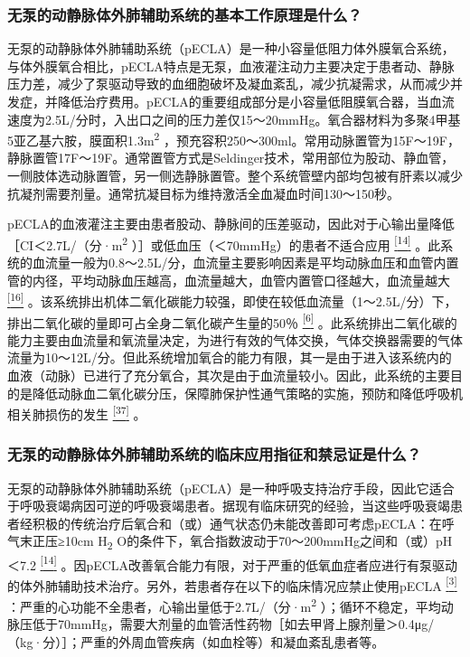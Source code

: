 \subsubsection{无泵的动静脉体外肺辅助系统的基本工作原理是什么？}

无泵的动静脉体外肺辅助系统（pECLA）是一种小容量低阻力体外膜氧合系统，与体外膜氧合相比，pECLA特点是无泵，血液灌注动力主要决定于患者动、静脉压力差，减少了泵驱动导致的血细胞破坏及凝血紊乱，减少抗凝需求，从而减少并发症，并降低治疗费用。pECLA的重要组成部分是小容量低阻膜氧合器，当血流速度为2.5L/分时，入出口之间的压力差仅15～20mmHg。氧合器材料为多聚4甲基5亚乙基六胺，膜面积1.3m\textsuperscript{2}
，预充容积250～300ml。常用动脉置管为15F～19F，静脉置管17F～19F。通常置管方式是Seldinger技术，常用部位为股动、静血管，一侧肢体选动脉置管，另一侧选静脉置管。整个系统管壁内部均包被有肝素以减少抗凝剂需要剂量。通常抗凝目标为维持激活全血凝血时间130～150秒。

pECLA的血液灌注主要由患者股动、静脉间的压差驱动，因此对于心输出量降低［CI＜2.7L/（分·m\textsuperscript{2}
）］或低血压（＜70mmHg）的患者不适合应用
\protect\hyperlink{text00030.htmlux5cux23ch14-29}{\textsuperscript{{[}14{]}}}
。此系统的血流量一般为0.8～2.5L/分，血流量主要影响因素是平均动脉血压和血管内置管的内径，平均动脉血压越高，血流量越大，血管内置管口径越大，血流量越大
\protect\hyperlink{text00030.htmlux5cux23ch16-29}{\textsuperscript{{[}16{]}}}
。该系统排出机体二氧化碳能力较强，即使在较低血流量（1～2.5L/分）下，排出二氧化碳的量即可占全身二氧化碳产生量的50％
\protect\hyperlink{text00030.htmlux5cux23ch6-29}{\textsuperscript{{[}6{]}}}
。此系统排出二氧化碳的能力主要由血流量和氧流量决定，为进行有效的气体交换，气体交换器需要的气体流量为10～12L/分。但此系统增加氧合的能力有限，其一是由于进入该系统内的血液（动脉）已进行了充分氧合，其次是由于血流量较小。因此，此系统的主要目的是降低动脉血二氧化碳分压，保障肺保护性通气策略的实施，预防和降低呼吸机相关肺损伤的发生
\protect\hyperlink{text00030.htmlux5cux23ch37-29}{\textsuperscript{{[}37{]}}}
。

\subsubsection{无泵的动静脉体外肺辅助系统的临床应用指征和禁忌证是什么？}

无泵的动静脉体外肺辅助系统（pECLA）是一种呼吸支持治疗手段，因此它适合于呼吸衰竭病因可逆的呼吸衰竭患者。据现有临床研究的经验，当这些呼吸衰竭患者经积极的传统治疗后氧合和（或）通气状态仍未能改善即可考虑pECLA：在呼气末正压≥10cm
H\textsubscript{2}
O的条件下，氧合指数波动于70～200mmHg之间和（或）pH＜7.2
\protect\hyperlink{text00030.htmlux5cux23ch14-29}{\textsuperscript{{[}14{]}}}
。因pECLA改善氧合能力有限，对于严重的低氧血症者应进行有泵驱动的体外肺辅助技术治疗。另外，若患者存在以下的临床情况应禁止使用pECLA
\protect\hyperlink{text00030.htmlux5cux23ch3-29}{\textsuperscript{{[}3{]}}}
：严重的心功能不全患者，心输出量低于2.7L/（分·m\textsuperscript{2}
）；循环不稳定，平均动脉压低于70mmHg，需要大剂量的血管活性药物［如去甲肾上腺剂量＞0.4μg/（kg·分）］；严重的外周血管疾病（如血栓等）和凝血紊乱患者等。

